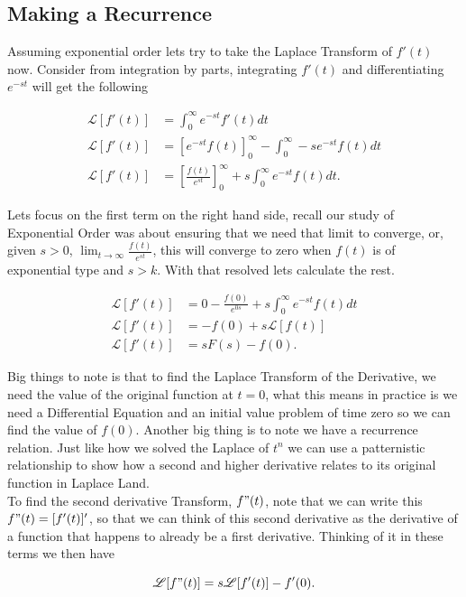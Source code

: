 \documentclass[12pt]{article}
\newcommand{\lp}{\mathscr{L}}
\begin{document}
\subsection{Making a Recurrence}

Assuming exponential order lets try to take the Laplace Transform of $f'(t)$ now. Consider from integration by parts, integrating $f'(t)$ and differentiating $e^{-st}$ will get the following

\begin{align*}
    \lp[f'(t)] &= \int_0^{\infty} e^{-st} f'(t) dt \\
    \lp[f'(t)] &= \left[ e^{-st} f(t) \right]_0^{\infty} - \int_0^{\infty} -se^{-st} f(t) dt \\
    \lp[f'(t)] &= \left[ \frac{f(t)}{e^{st}} \right]_0^{\infty} + s \int_0^{\infty} e^{-st} f(t) dt.
\end{align*}

Lets focus on the first term on the right hand side, recall our study of Exponential Order was about ensuring that we need that limit to converge, or, given $s>0$, $\lim_{t\to \infty} \frac{f(t)}{e^{st}}$, this will converge to zero when $f(t)$ is of exponential type and $s>k$. With that resolved lets calculate the rest.

\begin{align*}
    \lp[f'(t)] &= 0 - \frac{f(0)}{e^{0s}} + s \int_0^{\infty} e^{-st} f(t) dt \\
    \lp[f'(t)] &= -f(0) + s \lp[f(t)] \\
    \lp[f'(t)] &= sF(s)-f(0).
\end{align*}

Big things to note is that to find the Laplace Transform of the Derivative, we need the value of the original function at $t=0$, what this means in practice is we need a Differential Equation and an initial value problem of time zero so we can find the value of $f(0)$. Another big thing is to note we have a recurrence relation. Just like how we solved the Laplace of $t^n$ we can use a patternistic relationship to show how a second and higher derivative relates to its original function in Laplace Land. \\

To find the second derivative Transform, $f"(t)$, note that we can write this $f"(t)=[f'(t)]'$, so that we can think of this second derivative as the derivative of a function that happens to already be a first derivative. Thinking of it in these terms we then have

\begin{equation*}
    \lp[f"(t)] = s\lp[f'(t)]-f'(0).
\end{equation*}
\end{document}
